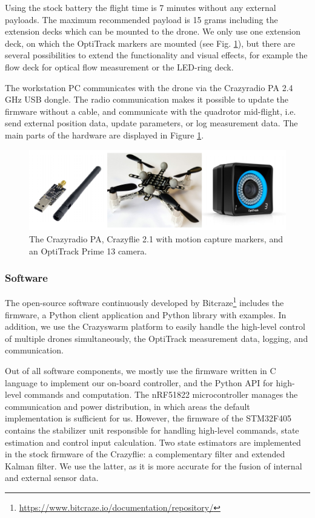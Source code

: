 Using the stock battery the flight time is 7 minutes without any external payloads. The maximum recommended payload is 15 grams including the extension decks which can be mounted to the drone. We only use one extension deck, on which the OptiTrack markers are mounted (see Fig. \ref{fig:hardware}), but there are several possibilities to extend the functionality and visual effects, for example the flow deck for optical flow measurement or the LED-ring deck.

The workstation PC communicates with the drone via the Crazyradio PA 2.4 GHz USB dongle. The radio communication makes it possible to update the firmware without a cable, and communicate with the quadrotor mid-flight, i.e. send external position data, update parameters, or log measurement data. The main parts of the hardware are displayed in Figure \ref{fig:hardware}.


\begin{figure}
\centering
\includegraphics[scale=.6]{Fig/hardware.pdf}
\caption{The Crazyradio PA, Crazyflie 2.1 with motion capture markers, and an OptiTrack Prime 13 camera.}\label{fig:hardware}
\end{figure}

\subsubsection{Software}
The open-source software continuously developed by Bitcraze\footnote{\url{https://www.bitcraze.io/documentation/repository/}} includes the firmware, a Python client application and Python library with examples. In addition, we use the Crazyswarm platform \cite{crazyswarm} to easily handle the high-level control of multiple drones simultaneously, the OptiTrack measurement data, logging, and communication.

Out of all software components, we mostly use the firmware written in C language to implement our on-board controller, and the Python API for high-level commands and computation. The nRF51822 microcontroller manages the communication and power distribution, in which areas the default implementation is sufficient for us. However, the firmware of the STM32F405 contains the stabilizer unit responsible for handling high-level commands, state estimation and control input calculation. Two state estimators are implemented in the stock firmware of the Crazyflie: a complementary filter and extended Kalman filter. We use the latter, as it is more accurate for the fusion of internal and external sensor data.

